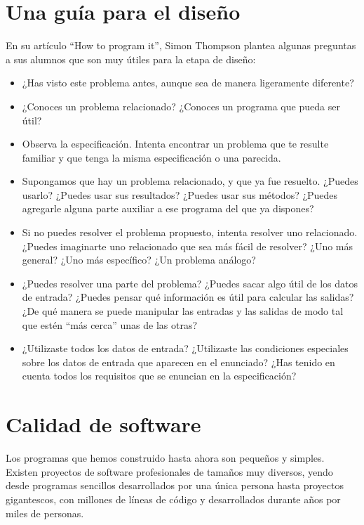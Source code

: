 \section{Una guía para el diseño}

En su artículo ``How to program it'', Simon Thompson plantea
algunas preguntas a sus alumnos que son muy útiles para la etapa
de diseño:

\begin{itemize}
\item ¿Has visto este problema antes, aunque sea de manera
ligeramente diferente?

\item ¿Conoces un problema relacionado? ¿Conoces un programa que
pueda ser útil?

\item Observa la especificación. Intenta encontrar un
problema que te resulte familiar y que tenga la misma
especificación o una parecida.

\item Supongamos que hay un problema relacionado, y que ya fue
resuelto. ¿Puedes usarlo? ¿Puedes usar sus resultados?  ¿Puedes usar sus
métodos? ¿Puedes agregarle alguna parte auxiliar a ese programa del que ya
dispones?

\item Si no puedes resolver el problema propuesto, intenta
resolver uno relacionado. ¿Puedes imaginarte uno relacionado que
sea más fácil de resolver? ¿Uno más general? ¿Uno más específico?
¿Un problema análogo?

\item ¿Puedes resolver una parte del problema?  ¿Puedes sacar algo
útil de los datos de entrada? ¿Puedes pensar qué información es
útil para calcular las salidas? ¿De qué manera se puede manipular
las entradas y las salidas de modo tal que estén ``más cerca''
unas de las otras?

\item ¿Utilizaste todos los datos de entrada? ¿Utilizaste las condiciones
especiales sobre los datos de entrada que aparecen en el
enunciado? ¿Has tenido en cuenta todos los requisitos que se
enuncian en la especificación?

\end{itemize}

\section{Calidad de software}

Los programas que hemos construido hasta ahora son pequeños y simples. Existen
proyectos de software profesionales de tamaños muy diversos, yendo desde
programas sencillos desarrollados por una única persona hasta
proyectos gigantescos, con millones de líneas de código y desarrollados
durante años por miles de personas.

